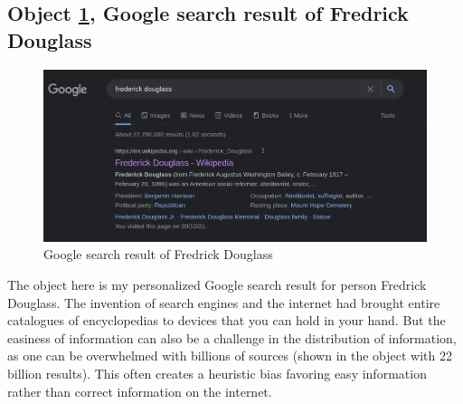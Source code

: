 \documentclass[a4paper,11pt]{article}
\begin{document}




\subsection*{Object \ref{fig:download}, Google search result of Fredrick Douglass}

\begin{figure}[h!]
 \centering
 \includegraphics[scale=0.25]{douglass.png}
 \caption{Google search result of Fredrick Douglass}
 \label{fig:download}
\end{figure}

The object here is my personalized Google search result for person Fredrick Douglass. The invention of search engines and the internet had brought entire catalogues of encyclopedias to devices that you can hold in your hand. But the easiness of information can also be a challenge in the distribution of information, as one can be overwhelmed with billions of sources (shown in the object with 22 billion results). This often creates a heuristic bias favoring
easy information rather than correct information on the internet.
\end{document}
